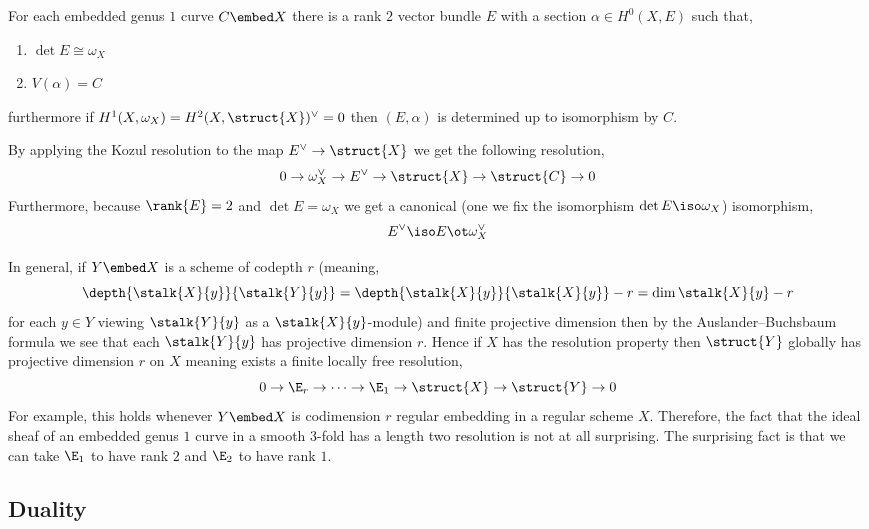 \documentclass[12pt]{article}
\begin{document}
\begin{theorem}
For each embedded genus $1$ curve $C \embed X$ there is a rank $2$ vector bundle $E$ with a section $\alpha \in H^0(X, E)$ such that,
\begin{enumerate}
\item $\det{E} \cong \omega_X$
\item $V(\alpha) = C$
\end{enumerate}
furthermore if $H^1(X, \omega_X) = H^2(X, \struct{X})^\vee = 0$ then $(E, \alpha)$ is determined up to isomorphism by $C$.
\end{theorem}

By applying the Kozul resolution to the map $E^\vee \to \struct{X}$ we get the following resolution,
\[ 0 \to \omega_X^\vee \to E^\vee \to \struct{X} \to \struct{C} \to 0 \]
Furthermore, because $\rank{E} = 2$ and $\det{E} = \omega_X$ we get a canonical (one we fix the isomorphism $\det{E} \iso \omega_X$) isomorphism,
\[ E^\vee \iso E \ot \omega_X^\vee \]

\begin{rmk}
In general, if $Y \embed X$ is a scheme of codepth $r$ (meaning,
\[ \depth{\stalk{X}{y}}{\stalk{Y}{y}} = \depth{\stalk{X}{y}}{\stalk{X}{y}} - r = \dim{\stalk{X}{y}} - r \]
for each $y \in Y$ viewing $\stalk{Y}{y}$ as a $\stalk{X}{y}$-module) and finite projective dimension then by the Auslander–Buchsbaum formula we see that each $\stalk{Y}{y}$ has projective dimension $r$. Hence if $X$ has the resolution property then $\struct{Y}$ globally has projective dimension $r$ on $X$ meaning exists a finite locally free resolution,
\[ 0 \to \E_{r} \to \cdots \to \E_{1} \to \struct{X} \to \struct{Y} \to 0 \]
For example, this holds whenever $Y \embed X$ is codimension $r$ regular embedding in a regular scheme $X$.
Therefore, the fact that the ideal sheaf of an embedded genus $1$ curve in a smooth 3-fold has a length two resolution is not at all surprising. The surprising fact is that we can take $\E_1$ to have rank $2$ and $\E_2$ to have rank $1$.
\end{rmk}

\subsection{Duality}
\end{document}
